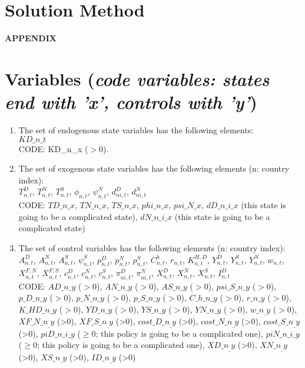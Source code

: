 \documentclass[12pt, bibtotoc, tablecaptionabove, figurecaptionabove, fleqn]{article}
\begin{document}
\section{Solution Method}


\newpage
\small



\clearpage\newpage

\appendix
\begin{center}
	\Large
	\textbf{APPENDIX}\\
\end{center}

\normalsize
\section{Variables (\emph{code variables: states end with 'x', controls with 'y'})}

\begin{enumerate}
	\item The set of endogenous state variables has the following elements: \\
	 $KD\_n\_t$\\
	 CODE: KD\_n\_x ($>0$).
	\item The set of exogenous state variables has the following elements (n: country index): \\
	 $T^D_{n,t}$, $T^N_{n,t}$, $T^S_{n,t}$, $\phi_{n,t}$, $\psi_{n,t}^N$, $d^D_{ni,t}$, $d^N_{ni,t}$ \\
	 CODE: $TD\_n\_x$, $TN\_n\_x$, $TS\_n\_x$, $phi\_n\_x$, $psi\_N\_x$, $dD\_n\_i\_x$ (this state is going to be a complicated state), $dN\_n\_i\_x$ (this state is going to be a complicated state) \\
	 
	 \item The set of control variables has the following elements (n: country index): \\
	 $A_{n, t}^{D}$, $A_{n, t}^{N}$, $A_{n, t}^{S}$, $\psi_{n,t}^S$, $p^{D}_{n,t}$, $p^{N}_{n,t}$, $p^{S}_{n,t}$, $C^h_{n,t}$, $r_{n,t}$, $K^{H,D}_{n,t}$, $Y^D_{n,t}$, $Y^S_{n,t}$, $Y^N_{n,t}$, $w_{n,t}$, $X^{F,N}_{n,t}$, $X^{F,S}_{n,t}$, $c^{D}_{n,t}$, $c^{N}_{n,t}$, $c^{S}_{n,t}$, $\pi^D_{ni,t}$, $\pi^N_{ni,t}$, $X^D_{n,t}$, $X^N_{n,t}$, $X^S_{n,t}$, $I^D_{n,t}$\\
	 
	 CODE: $AD\_n\_y$ ($>0$), $AN\_n\_y$ ($>0$), $AS\_n\_y$ ($>0$), 
	 $psi\_S\_n\_y$ ($>0$), $p\_D\_n\_y$ ($>0$), $p\_N\_n\_y$ ($>0$), $p\_S\_n\_y$ ($>0$), $C\_h\_n\_y$ ($>0$), $r\_n\_y$ ($>0$), $K\_HD\_n\_y$ ($>0$), $YD\_n\_y$ ($>0$), $YS\_n\_y$ ($>0$), $YN\_n\_y$ ($>0$), $w\_n_\_y$ ($>0$), $XF\_N\_n_\_y$ (>0), $XF\_S\_n_\_y$ (>0), $cost\_D\_n_\_y$ (>0), $cost\_N\_n_\_y$ (>0), $cost\_S\_n_\_y$ (>0), $piD\_n\_i\_y$ ($\geq 0$; this policy is going to be a complicated one), $piN\_n\_i\_y$ ($\geq 0$; this policy is going to be a complicated one), $XD\_n_\_y$ (>0), $XN\_n_\_y$ (>0), $XS\_n_\_y$ (>0), $ID\_n_\_y$ (>0)   \\
\end{enumerate}
\end{document}
